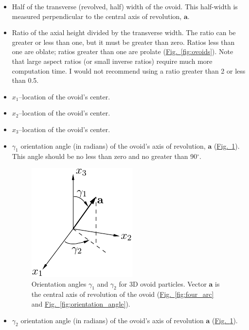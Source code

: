 \documentclass[letterpaper,11pt]{article}
\begin{document}
\begin{itemize}
\item
Half of the transverse (revolved, half) width of the ovoid.  
This half-width is measured perpendicular
to the central axis of revolution, $\mathbf{a}$.
\item
Ratio of the axial height divided
by the transverse width.  
The ratio can be greater or less than one, but it must be greater than zero.
Ratios less than one are oblate; ratios greater than one are prolate
(\hyperref[fig:ovoids]{Fig.~\ref*{fig:ovoids}}).
Note that large aspect ratios (or small inverse ratios) require much more
computation time.  I would not recommend using a ratio greater than 2 or
less than 0.5.
\item
$x_{1}$--location of the ovoid's center.
\item
$x_{2}$--location of the ovoid's center.
\item
$x_{3}$--location of the ovoid's center.
\item
$\gamma_{1}$ orientation angle (in radians) of the ovoid's axis
of revolution, $\mathbf{a}$
(\hyperref[fig:coordinates]{Fig.~\ref*{fig:coordinates}}).
This angle should be no less than zero and no greater than
90$^{\circ}$.
\begin{figure}
  \centering
  \includegraphics{Figures/coordinates}
  \caption{Orientation angles $\gamma_{1}$ and $\gamma_{2}$ 
           for 3D ovoid particles.
           Vector $\mathbf{a}$ is the central axis of revolution of the ovoid
           (\hyperref[fig:four_arc]{Fig.~\ref*{fig:four_arc}}
           and \hyperref[fig:orientation_angle]{Fig.~\ref*{fig:orientation_angle}}).}
  \label{fig:coordinates}
\end{figure}
\item
$\gamma_{2}$ orientation angle (in radians) of the ovoid's axis
of revolution $\mathbf{a}$
(\hyperref[fig:coordinates]{Fig.~\ref*{fig:coordinates}}).
\end{itemize}
%
%
\end{document}
